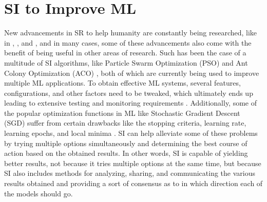 \documentclass[twocolumn]{bmcart}%
\begin{document}
\section*{SI to Improve ML}

New advancements in SR to help humanity are constantly being researched, like in \cite{Penders}, \cite{Murphy}, \cite{Lomonaco} and \cite{Wilson}, and in many cases, some of these advancements also come with the benefit of being useful in other areas of research. Such has been the case of a multitude of SI algorithms, like Particle Swarm Optimization (PSO) \cite{Bakhshipour, Han} and Ant Colony Optimization (ACO) \cite{Zhiguo2}, both of which are currently being used to improve multiple ML applications. To obtain effective ML systems, several features, configurations, and other factors need to be tweaked, which ultimately ends up leading to extensive testing and monitoring requirements \cite{Breck}. Additionally, some of the popular optimization functions in ML like Stochastic Gradient Descent (SGD) suffer from certain drawbacks like the stopping criteria, learning rate, learning epochs, and local minima \cite{Han}. SI can help alleviate some of these problems by trying multiple options simultaneously and determining the best course of action based on the obtained results. In other words, SI is capable of yielding better results, not because it tries multiple options at the same time, but because SI also includes methods for analyzing, sharing, and communicating the various results obtained and providing a sort of consensus as to in which direction each of the models should go. 
\end{document}
